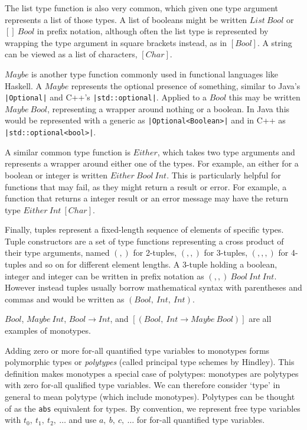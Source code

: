 \documentclass[a4paper,fleqn,oneside,12pt]{report}
\begin{document}
The list type function is also very common, which given one type argument represents a list of those types. A list of booleans might be written $List\ Bool$ or $[]\ Bool$ in prefix notation, although often the list type is represented by wrapping the type argument in square brackets instead, as in $[Bool]$. A string can be viewed as a list of characters, $[Char]$.

$Maybe$ is another type function commonly used in functional languages like Haskell. A $Maybe$ represents the optional presence of something, similar to Java’s \texttt{|Optional|} and C++’s \texttt{|std::optional|}. Applied to a $Bool$ this may be written $Maybe\ Bool$, representing a wrapper around nothing or a boolean. In Java this would be represented with a generic as \texttt{|Optional<Boolean>|} and in C++ as \texttt{|std::optional<bool>|}.

A similar common type function is $Either$, which takes two type arguments and represents a wrapper around either one of the types. For example, an either for a boolean or integer is written $Either\ Bool\ Int$. This is particularly helpful for functions that may fail, as they might return a result or error. For example, a function that returns a integer result or an error message may have the return type $Either\ Int\ [Char]$.

Finally, tuples represent a fixed-length sequence of elements of specific types. Tuple constructors are a set of type functions representing a cross product of their type arguments, named $(,)$ for 2-tuples, $(,,)$ for 3-tuples, $(,,,)$ for 4-tuples and so on for different element lengths. A 3-tuple holding a boolean, integer and integer can be written in prefix notation as $(,,)\ Bool\ Int\ Int$. However instead tuples usually borrow mathematical syntax with parentheses and commas and would be written as $(Bool,\ Int,\ Int)$.

$Bool$, $Maybe\ Int$, $Bool \rightarrow Int$, and $[(Bool,\ Int \rightarrow Maybe\ Bool)]$ are all examples of monotypes.

Adding zero or more for-all quantified type variables to monotypes forms polymorphic types or \textit{polytypes} (called principal type schemes by Hindley). This definition makes monotypes a special case of polytypes: monotypes are polytypes with zero for-all qualified type variables. We can therefore consider `type' in general to mean polytype (which include monotypes). Polytypes can be thought of as the \texttt{abs} equivalent for types. By convention, we represent free type variables with $t_0,\ t_1,\ t_2,\ \dots$ and use $a,\ b,\ c,\ \dots$ for for-all quantified type variables.
\end{document}
